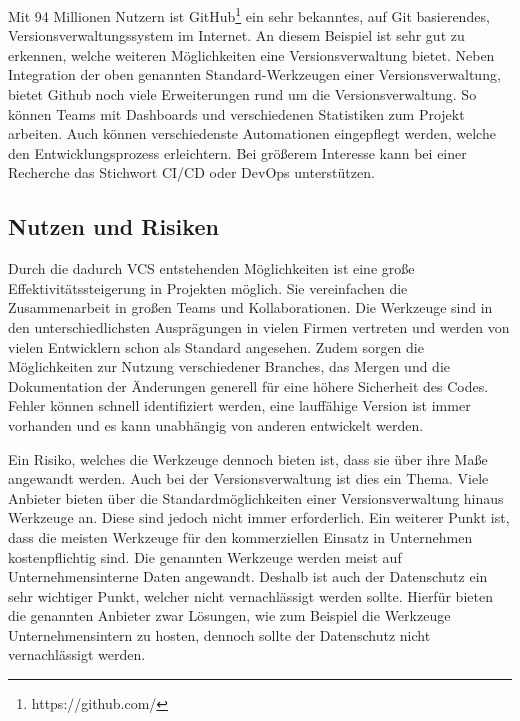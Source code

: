 Mit 94 Millionen Nutzern ist GitHub\footnote{https://github.com/} ein sehr bekanntes, auf Git basierendes, Versionsverwaltungssystem im Internet. An diesem Beispiel ist sehr gut zu erkennen, welche weiteren Möglichkeiten eine Versionsverwaltung bietet. Neben Integration der oben genannten Standard-Werkzeugen einer Versionsverwaltung, bietet Github noch viele Erweiterungen rund um die Versionsverwaltung. So können Teams mit Dashboards und verschiedenen Statistiken zum Projekt arbeiten. Auch können verschiedenste Automationen eingepflegt werden, welche den Entwicklungsprozess erleichtern. Bei größerem Interesse kann bei einer Recherche das Stichwort CI/CD  oder DevOps unterstützen. 

\subsection{Nutzen und Risiken}
\label{subsec:documentation_collaboration_risks}
Durch die dadurch VCS entstehenden Möglichkeiten ist eine große Effektivitätssteigerung in Projekten möglich. Sie vereinfachen die Zusammenarbeit in großen Teams und Kollaborationen. Die Werkzeuge sind in den unterschiedlichsten Ausprägungen in vielen Firmen vertreten und werden von vielen Entwicklern schon als Standard angesehen. Zudem sorgen die Möglichkeiten zur Nutzung verschiedener Branches, das Mergen und die Dokumentation der Änderungen generell für eine höhere Sicherheit des Codes. Fehler können schnell identifiziert werden, eine lauffähige Version ist immer vorhanden und es kann unabhängig von anderen entwickelt werden. 

Ein Risiko, welches die Werkzeuge dennoch bieten ist, dass sie über ihre Maße angewandt werden. Auch bei der Versionsverwaltung ist dies ein Thema. Viele Anbieter bieten über die Standardmöglichkeiten einer Versionsverwaltung hinaus Werkzeuge an. Diese sind jedoch nicht immer erforderlich. Ein weiterer Punkt ist, dass die meisten Werkzeuge für den kommerziellen Einsatz in Unternehmen kostenpflichtig sind. Die genannten Werkzeuge werden meist auf Unternehmensinterne Daten angewandt. Deshalb ist auch der Datenschutz ein sehr wichtiger Punkt, welcher nicht vernachlässigt werden sollte. Hierfür bieten die genannten Anbieter zwar Lösungen, wie zum Beispiel die Werkzeuge Unternehmensintern zu hosten, dennoch sollte der Datenschutz nicht vernachlässigt werden. 
